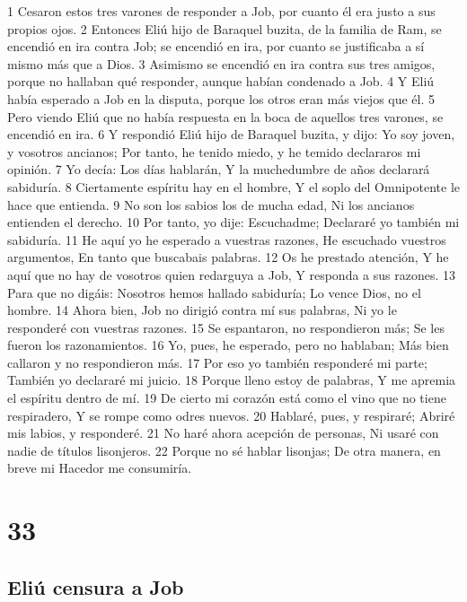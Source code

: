 1 Cesaron estos tres varones de responder a Job, por cuanto él era justo a sus propios ojos.
2 Entonces Eliú hijo de Baraquel buzita, de la familia de Ram, se encendió en ira contra Job; se encendió en ira, por cuanto se justificaba a sí mismo más que a Dios.
3 Asimismo se encendió en ira contra sus tres amigos, porque no hallaban qué responder, aunque habían condenado a Job.
4 Y Eliú había esperado a Job en la disputa, porque los otros eran más viejos que él.
5 Pero viendo Eliú que no había respuesta en la boca de aquellos tres varones, se encendió en ira.
6 Y respondió Eliú hijo de Baraquel buzita, y dijo:
Yo soy joven, y vosotros ancianos;
Por tanto, he tenido miedo, y he temido declararos mi opinión.
7 Yo decía: Los días hablarán,
Y la muchedumbre de años declarará sabiduría.
8 Ciertamente espíritu hay en el hombre,
Y el soplo del Omnipotente le hace que entienda.
9 No son los sabios los de mucha edad,
Ni los ancianos entienden el derecho.
10 Por tanto, yo dije: Escuchadme;
Declararé yo también mi sabiduría.
11 He aquí yo he esperado a vuestras razones,
He escuchado vuestros argumentos,
En tanto que buscabais palabras.
12 Os he prestado atención,
Y he aquí que no hay de vosotros quien redarguya a Job,
Y responda a sus razones.
13 Para que no digáis: Nosotros hemos hallado sabiduría;
Lo vence Dios, no el hombre.
14 Ahora bien, Job no dirigió contra mí sus palabras,
Ni yo le responderé con vuestras razones.
15 Se espantaron, no respondieron más;
Se les fueron los razonamientos.
16 Yo, pues, he esperado, pero no hablaban;
Más bien callaron y no respondieron más.
17 Por eso yo también responderé mi parte;
También yo declararé mi juicio. 
18 Porque lleno estoy de palabras, 
Y me apremia el espíritu dentro de mí.
19 De cierto mi corazón está como el vino que no tiene respiradero,
Y se rompe como odres nuevos.
20 Hablaré, pues, y respiraré;
Abriré mis labios, y responderé.
21 No haré ahora acepción de personas,
Ni usaré con nadie de títulos lisonjeros.
22 Porque no sé hablar lisonjas;
De otra manera, en breve mi Hacedor me consumiría.

\chapter{33}

\section*{Eliú censura a Job}

